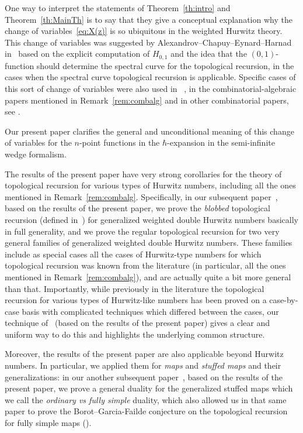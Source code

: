 \begin{remark} One way to interpret the statements of Theorem~\ref{th:intro} and Theorem~\ref{th:MainTh} is to say that they give a conceptual explanation why the change of variables~\eqref{eq:X(z)} is so ubiquitous in the weighted Hurwitz theory. This change of variables was suggested by Alexandrov--Chapuy--Eynard--Harnad in~\cite{ACEH-1} based on the explicit computation of $H_{0,1}$ and the idea that the $(0,1)$-function should determine the spectral curve for the topological recursion, in the cases when the spectral curve topological recursion is applicable. Specific cases of this sort of change of variables were also used in ~\cite{ACEHferm}, in the combinatorial-algebraic papers mentioned in Remark~\ref{rem:combalg} and in other combinatorial papers, see \eg \cite{chapuy2009asymptotic}.

Our present paper clarifies the general and unconditional meaning of this change of variables for the $n$-point functions in the $\hbar$-expansion in the semi-infinite wedge formalism.
\end{remark}

\begin{remark}\label{rem:toprec}
The results of the present paper have very strong corollaries for the theory of topological recursion for various types of Hurwitz numbers, including all the ones mentioned in Remark~\ref{rem:combalg}. Specifically, in our subsequent paper~\cite{BDKS21toprec}, based on the results of the present paper, we prove the \emph{blobbed} topological recursion (defined in~\cite{BS17}) for generalized weighted double Hurwitz numbers basically in full generality, and we prove the regular topological recursion for two very general families of generalized weighted double Hurwitz numbers. These families include as special cases all the cases of Hurwitz-type numbers for which topological recursion was known from the literature (in particular, all the ones mentioned in Remark~\ref{rem:combalg}), and are actually quite a bit more general than that. Importantly, while previously in the literature the topological recursion for various types of Hurwitz-like numbers has been proved on a case-by-case basis with complicated techniques which differed between the cases, our technique of~\cite{BDKS21toprec} (based on the results of the present paper) gives a clear and uniform way to do this and highlights the underlying common structure.

Moreover, the results of the present paper are also applicable beyond Hurwitz numbers. In particular, we applied them for \emph{maps} and \emph{stuffed maps} and their generalizations: in our another subsequent paper~\cite{BDKS21fully}, based on the results of the present paper, we prove a general duality for the generalized stuffed maps which we call the \emph{ordinary vs fully simple} duality, which also allowed us in that same paper to prove the Borot--Garcia-Failde conjecture on the topological recursion for fully simple maps (\cite[Conj.\,5.3]{borot2018simple}).
\end{remark}

